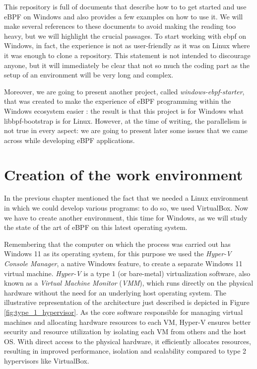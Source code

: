 This repository is full of documents that describe how to to get started and use eBPF on Windows and also provides a few examples on how to use it.
We will make several references to these documents to avoid making the reading too heavy, but we will highlight the crucial passages.
To start working with ebpf on Windows, in fact, the experience is not as user-friendly as it was on Linux where it was enough to clone a repository.
This statement is not intended to discourage anyone, but it will immediately be clear that not so much the coding part as the setup of an environment will be very long and complex.

Moreover, we are going to present another project, called \textit{windows-ebpf-starter}, that was created to make the experience of eBPF programming within the Windows ecosystem easier \cite{WineBPFStarterRepo}: the result is that this project is for Windows what libbpf-bootstrap is for Linux.
However, at the time of writing, the parallelism is not true in every aspect: we are going to present later some issues that we came across while developing eBPF applications.

\section{Creation of the work environment}

In the previous chapter mentioned the fact that we needed a Linux environment in which we could develop various programs: to do so, we used VirtualBox.
Now we have to create another environment, this time for Windows, as we will study the state of the art of eBPF on this latest operating system. 

Remembering that the computer on which the process was carried out has Windows 11 as its operating system, for this purpose we used the \textit{Hyper-V Console Manager}, a native Windows feature, to create a separate Windows 11 virtual machine.
\textit{Hyper-V} is a type 1 (or bare-metal) virtualization software, also known as a \textit{Virtual Machine Monitor} (\textit{VMM}), which runs directly on the physical hardware without the need for an underlying host operating system. 
The illustrative representation of the architecture just described is depicted in Figure \ref{fig:type_1_hypervisor}.
As the core software responsible for managing virtual machines and allocating hardware resources to each VM, Hyper-V ensures better security and resource utilization by isolating each VM from others and the host OS. 
With direct access to the physical hardware, it efficiently allocates resources, resulting in improved performance, isolation and scalability compared to type 2 hypervisors like VirtualBox.

